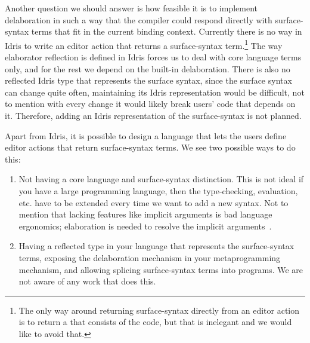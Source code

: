 Another question we should answer is how feasible it is to implement
delaboration in such a way that the compiler could respond directly with
surface-syntax terms that fit in the current binding context.
Currently there is no way in Idris to write an editor action that returns a
surface-syntax term.\footnote{ The only way around returning surface-syntax
directly from an editor action is to return a  that consists of the
code, but that is inelegant and we would like to avoid that.} The way
elaborator reflection is defined in Idris forces us to deal with core language
terms only, and for the rest we depend on the built-in delaboration.  There is
also no reflected Idris type that represents the surface syntax, since the
surface syntax can change quite often, maintaining its Idris representation
would be difficult, not to mention with every change it would likely break
users' code that depends on it.  Therefore, adding an Idris representation of
the surface-syntax is not planned.

Apart from Idris, it is possible to design a language that lets the users
define editor actions that return surface-syntax terms. We see two possible ways to do this:
\begin{enumerate}
  \item Not having a core language and surface-syntax distinction. This is not
    ideal if you have a large programming language, then the type-checking,
    evaluation, etc. have to be extended every time we want to add a new
    syntax. Not to mention that lacking features like implicit arguments is bad
    language ergonomics; elaboration is needed to resolve the implicit
    arguments~\cite{pollack}.
  \item Having a reflected type in your language that represents the
    surface-syntax terms, exposing the delaboration mechanism in your
    metaprogramming mechanism, and allowing splicing surface-syntax terms into
    programs. We are not aware of any work that does this.
\end{enumerate}
